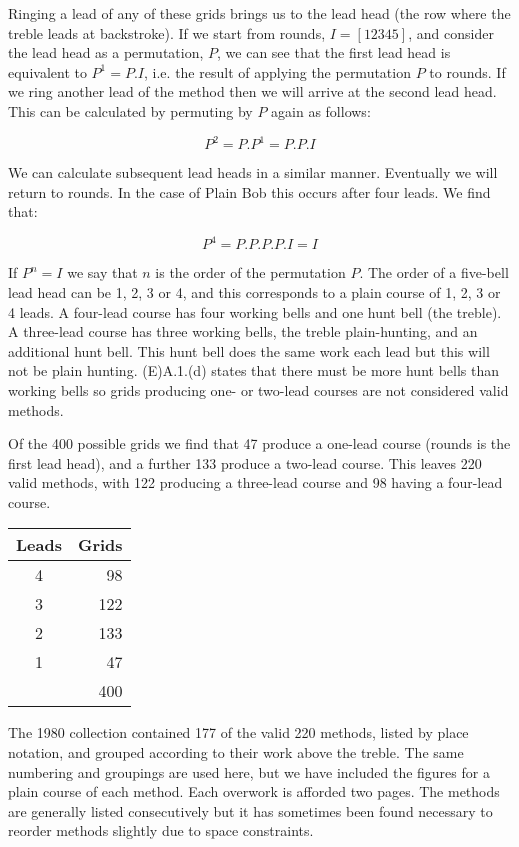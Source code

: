 Ringing a lead of any of these grids brings us to the lead head
(the row where the treble leads at backstroke).
If we start from rounds, \(I = [12345]\),
and consider the lead head as a permutation, \(P\),
we can see that the first lead head is equivalent to \(P^1 = P.I\),
i.e. the result of applying the permutation \(P\) to rounds.
If we ring another lead of the method then we will arrive at the second lead
head.
This can be calculated by permuting by \(P\) again as follows:

\begin{equation}
P^2 = P.P^1 = P.P.I
\end{equation}

We can calculate subsequent lead heads in a similar manner.
Eventually we will return to rounds.
In the case of Plain Bob this occurs after four leads.
We find that:

\begin{equation}
P^4 = P.P.P.P.I = I
\end{equation}

If \(P^n = I\) we say that \(n\) is the order of the permutation \(P\).
The order of a five-bell lead head can be 1, 2, 3 or 4,
and this corresponds to a plain course of 1, 2, 3 or 4 leads.
A four-lead course has four working bells and one hunt bell (the treble).
A three-lead course has three working bells, the treble plain-hunting,
and an additional hunt bell.
This hunt bell does the same work each lead but this will not be plain hunting.
(E)A.1.(d) states that there must be more hunt bells than working bells so grids
producing one- or two-lead courses are not considered valid methods.

Of the 400 possible grids we find that 47 produce a one-lead course
(rounds is the first lead head),
and a further 133 produce a two-lead course.
This leaves 220 valid methods,
with 122 producing a three-lead course and 98 having a four-lead course.

\begin{center}
  \begin{tabular}{c | r}
    Leads & Grids \\
    \hline
    4 & 98 \\
    3 & 122 \\
    2 & 133 \\
    1 & 47 \\
    \hline \hline
      & 400
  \end{tabular}
\end{center}

The 1980 collection contained 177 of the valid 220 methods,
listed by place notation, and grouped according to their work above the treble.
The same numbering and groupings are used here, but we have included the figures
for a plain course of each method.
Each overwork is afforded two pages.
The methods are generally listed consecutively but it has sometimes been found
necessary to reorder methods slightly due to space constraints.

